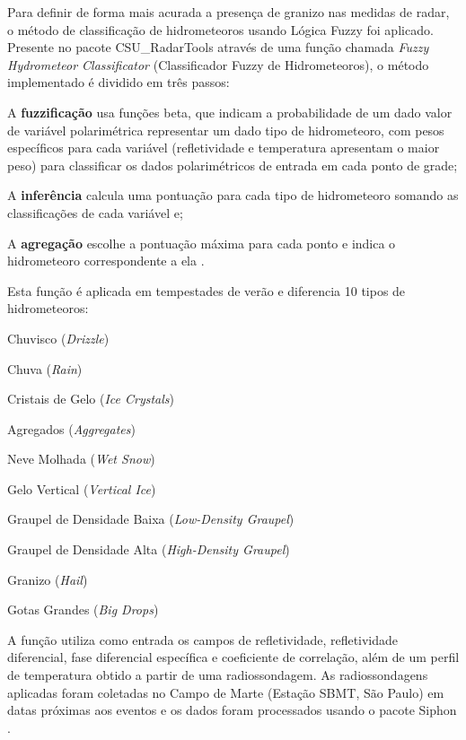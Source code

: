 Para definir de forma mais acurada a presença de granizo nas medidas de radar, o método de classificação de hidrometeoros usando Lógica Fuzzy foi aplicado. Presente no pacote CSU\_RadarTools \cite{Lang2017a} através de uma função chamada \textit{Fuzzy Hydrometeor Classificator} (Classificador Fuzzy de Hidrometeoros), o método implementado é dividido em três passos:

\begin{alineas}
	\item A \textbf{fuzzificação} usa funções beta, que indicam a probabilidade de um dado valor de variável polarimétrica representar um dado tipo de hidrometeoro, com pesos específicos para cada variável (refletividade e temperatura apresentam o maior peso) para classificar os dados polarimétricos de entrada em cada ponto de grade;
	\item A \textbf{inferência} calcula uma pontuação para cada tipo de hidrometeoro somando as classificações de cada variável e;
	\item A \textbf{agregação} escolhe a pontuação máxima para cada ponto e indica o hidrometeoro correspondente a ela \cite{Liu2000a}.
\end{alineas}

Esta função é aplicada em tempestades de verão e diferencia 10 tipos de hidrometeoros:

\begin{alineas}
	\item Chuvisco (\textit{Drizzle})
	\item Chuva (\textit{Rain})
	\item Cristais de Gelo (\textit{Ice Crystals})
	\item Agregados (\textit{Aggregates})
	\item Neve Molhada (\textit{Wet Snow})
	\item Gelo Vertical (\textit{Vertical Ice})
	\item Graupel de Densidade Baixa (\textit{Low-Density Graupel})
	\item Graupel de Densidade Alta (\textit{High-Density Graupel})
	\item Granizo (\textit{Hail})
	\item Gotas Grandes (\textit{Big Drops})
\end{alineas}

A função utiliza como entrada os campos de refletividade, refletividade diferencial, fase diferencial específica e coeficiente de correlação, além de um perfil de temperatura obtido a partir de uma radiossondagem. As radiossondagens aplicadas foram coletadas no Campo de Marte (Estação SBMT, São Paulo) em datas próximas aos eventos e os dados foram processados usando o pacote Siphon \cite{siphon}.

